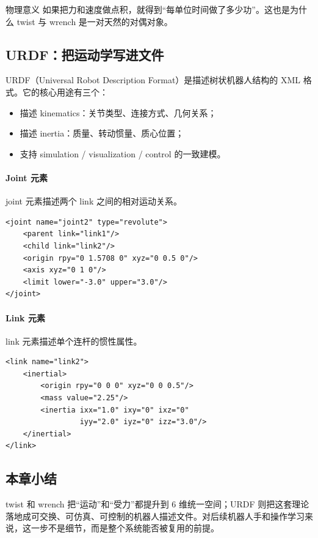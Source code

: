 \documentclass[a4paper]{article}
\begin{document}
\begin{knowledgebox}{物理意义}
如果把力和速度做点积，就得到“每单位时间做了多少功”。这也是为什么 twist 与 wrench 是一对天然的对偶对象。
\end{knowledgebox}

\subsection{URDF：把运动学写进文件}
URDF（Universal Robot Description Format）是描述树状机器人结构的 XML 格式。它的核心用途有三个：
\begin{itemize}
  \item 描述 kinematics：关节类型、连接方式、几何关系；
  \item 描述 inertia：质量、转动惯量、质心位置；
  \item 支持 simulation / visualization / control 的一致建模。
\end{itemize}

\paragraph{Joint 元素}
joint 元素描述两个 link 之间的相对运动关系。
\begin{lstlisting}[caption={URDF 的 joint 元素示例}]
<joint name="joint2" type="revolute">
    <parent link="link1"/>
    <child link="link2"/>
    <origin rpy="0 1.5708 0" xyz="0 0.5 0"/>
    <axis xyz="0 1 0"/>
    <limit lower="-3.0" upper="3.0"/>
</joint>
\end{lstlisting}

\paragraph{Link 元素}
link 元素描述单个连杆的惯性属性。
\begin{lstlisting}[caption={URDF 的 link 元素示例}]
<link name="link2">
    <inertial>
        <origin rpy="0 0 0" xyz="0 0 0.5"/>
        <mass value="2.25"/>
        <inertia ixx="1.0" ixy="0" ixz="0"
                 iyy="2.0" iyz="0" izz="3.0"/>
    </inertial>
</link>
\end{lstlisting}

\subsection{本章小结}
twist 和 wrench 把“运动”和“受力”都提升到 6 维统一空间；URDF 则把这套理论落地成可交换、可仿真、可控制的机器人描述文件。对后续机器人手和操作学习来说，这一步不是细节，而是整个系统能否被复用的前提。
\end{document}
